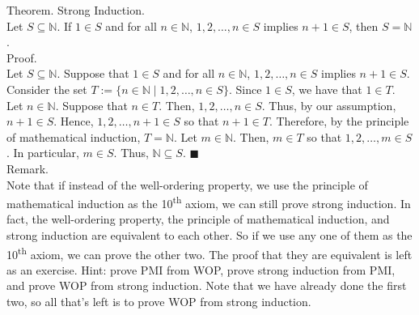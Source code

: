 \documentclass[twocolumn]{article}
\newcommand{\qed}{$\blacksquare$}
\newcommand{\naturals}{\mathbb{N}}
\begin{document}
Theorem. Strong Induction. \\
Let $S \subseteq \naturals$. If $1 \in S$ and for all $n \in \naturals$, $1, 2, \ldots, n \in S$ implies $n + 1 \in S$, then $S = \naturals$. \\
Proof. \\
Let $S \subseteq \naturals$. Suppose that $1 \in S$ and for all $n \in \naturals$, $1, 2, \ldots, n \in S$ implies $n + 1 \in S$. Consider the set $T := \{ n \in \naturals \mid 1, 2, \ldots, n \in S \}$. Since $1 \in S$, we have that $1 \in T$. Let $n \in \naturals$. Suppose that $n \in T$. Then, $1, 2, \ldots, n \in S$. Thus, by our assumption, $n + 1 \in S$. Hence, $1, 2, \ldots, n + 1 \in S$ so that $n + 1 \in T$. Therefore, by the principle of mathematical induction, $T = \naturals$.  Let $m \in \naturals$. Then, $m \in T$ so that $1, 2, \ldots, m \in S$. In particular, $m \in S$. Thus, $\naturals \subseteq S$. \qed \\

Remark. \\
Note that if instead of the well-ordering property, we use the principle of mathematical induction as the 10\textsuperscript{th} axiom, we can still prove strong induction. In fact, the well-ordering property, the principle of mathematical induction, and strong induction are equivalent to each other. So if we use any one of them as the 10\textsuperscript{th} axiom, we can prove the other two. The proof that they are equivalent is left as an exercise. Hint: prove PMI from WOP, prove strong induction from PMI, and prove WOP from strong induction. Note that we have already done the first two, so all that's left is to prove WOP from strong induction. \\
\end{document}
